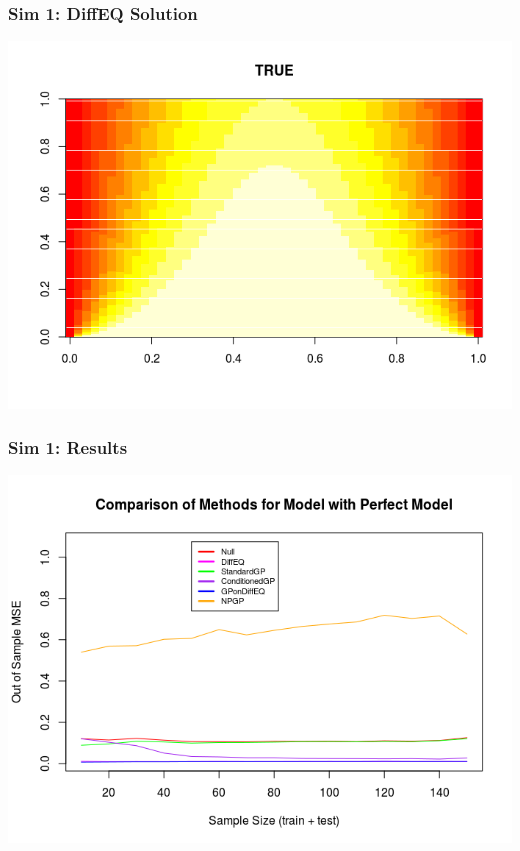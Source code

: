 \documentclass{beamer}
\begin{document}
	\begin{frame}
		\frametitle{Sim 1: DiffEQ Solution}
		
		\includegraphics[scale=0.65]{PrezImage7.png}
		
	\end{frame}
	
	\begin{frame}
		\frametitle{Sim 1: Results}
		
		\includegraphics[scale=0.5]{PrezImage4.png}
		
	\end{frame}
	
\end{document}
